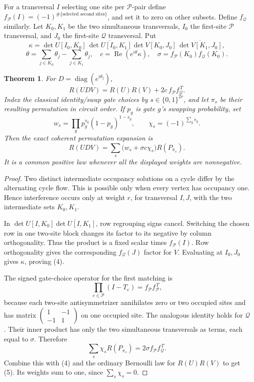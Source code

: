 \documentclass[11pt]{article}
\newtheorem{theorem}{Theorem}[section]\newtheorem{proposition}[theorem]{Proposition}
\newcommand{\diag}{\operatorname{diag}}\newcommand{\Rea}{\operatorname{Re}}
\begin{document}
For a transversal $I$ selecting one site per $\mathcal P$-pair define
$f_{\mathcal P}(I)=(-1)^{\#\{\text{selected second sites}\}}$, and set it to zero on other subsets. Define $f_{\mathcal Q}$ similarly. Let $K_0,K_1$ be the two simultaneous transversals, $I_0$ the first-site $\mathcal P$ transversal, and $J_0$ the first-site $\mathcal Q$ transversal. Put
\[
\kappa=\det U[I_0,K_0]\,\overline{\det U[I_0,K_1]}
        \det V[K_0,J_0]\,\overline{\det V[K_1,J_0]},
\]
\[
\theta=\sum_{j\in K_0}\theta_j-\sum_{j\in K_1}\theta_j,\quad
c=\Rea(e^{i\theta}\kappa),\quad
\sigma=f_{\mathcal P}(K_0)f_{\mathcal Q}(K_0).
\]

\begin{theorem}\label{cycle}
For $D=\diag(e^{i\theta_j})$,
\[
R(UDV)=R(U)R(V)+2c\,f_{\mathcal P}f_{\mathcal Q}^{\,T}.
\tag{4}
\]
Index the classical identity/swap gate choices by $s\in\{0,1\}^{2r}$, and let $\pi_s$ be their resulting permutation in circuit order. If $p_g$ is gate $g$'s swapping probability, set
\[
w_s=\prod_g p_g^{s_g}(1-p_g)^{1-s_g},\qquad
\chi_s=(-1)^{\sum_gs_g}.
\]
Then the exact coherent permutation expansion is
\[
\boxed{\quad R(UDV)=\sum_s\bigl(w_s+\sigma c\chi_s\bigr)R(P_{\pi_s}).\quad}
\tag{5}
\]
It is a common positive law whenever all the displayed weights are nonnegative.
\end{theorem}
\begin{proof}
Two distinct intermediate occupancy solutions on a cycle differ by the alternating cycle flow. This is possible only when every vertex has occupancy one. Hence interference occurs only at weight $r$, for transversal $I,J$, with the two intermediate sets $K_0,K_1$.

In $\det U[I,K_0]\overline{\det U[I,K_1]}$, row regrouping signs cancel. Switching the chosen row in one two-site block changes its factor to its negative by column orthogonality. Thus the product is a fixed scalar times $f_{\mathcal P}(I)$. Row orthogonality gives the corresponding $f_{\mathcal Q}(J)$ factor for $V$. Evaluating at $I_0,J_0$ gives $\kappa$, proving (4).

The signed gate-choice operator for the first matching is
\[
\prod_{e\in\mathcal P}(I-T_e)=f_{\mathcal P}f_{\mathcal P}^{\,T},
\]
because each two-site antisymmetrizer annihilates zero or two occupied sites and has matrix $\left(\begin{smallmatrix}1&-1\\-1&1\end{smallmatrix}\right)$ on one occupied site. The analogous identity holds for $\mathcal Q$. Their inner product has only the two simultaneous transversals as terms, each equal to $\sigma$. Therefore
\[
\sum_s\chi_sR(P_{\pi_s})=2\sigma f_{\mathcal P}f_{\mathcal Q}^{\,T}.
\]
Combine this with (4) and the ordinary Bernoulli law for $R(U)R(V)$ to get (5). Its weights sum to one, since $\sum_s\chi_s=0$.
\end{proof}
\end{document}
